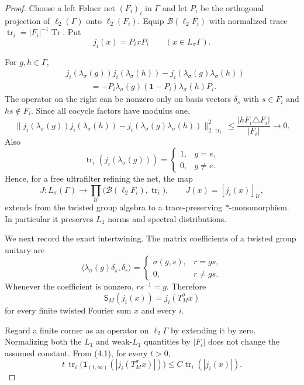 \documentclass[11pt]{article}
\theoremstyle{remark}
\newcommand{\Tr}{\operatorname{Tr}}
\newcommand{\one}{\mathbf 1}
\begin{document}
\begin{proof}
Choose a left F\o lner net $(F_i)_i$ in $\Gamma$ and let $P_i$ be the
orthogonal projection of $\ell_2(\Gamma)$ onto $\ell_2(F_i)$. Equip
$\mathcal B(\ell_2F_i)$ with normalized trace
$\operatorname{tr}_i=|F_i|^{-1}\Tr$. Put
\[
 j_i(x)=P_i xP_i \qquad (x\in L_\sigma\Gamma).
\]

For $g,h\in\Gamma$,
\begin{align*}
 &j_i(\lambda_\sigma(g))j_i(\lambda_\sigma(h))
   -j_i(\lambda_\sigma(g)\lambda_\sigma(h))\\
 &\hspace{3em}
 =-P_i\lambda_\sigma(g)(\one-P_i)\lambda_\sigma(h)P_i.
\end{align*}
The operator on the right can be nonzero only on basis vectors
$\delta_s$ with $s\in F_i$ and $hs\notin F_i$. Since all cocycle factors
have modulus one,
\[
 \big\|j_i(\lambda_\sigma(g))j_i(\lambda_\sigma(h))
 -j_i(\lambda_\sigma(g)\lambda_\sigma(h))\big\|_{2,\operatorname{tr}_i}^2
 \le \frac{|hF_i\triangle F_i|}{|F_i|}\longrightarrow0.
\]
Also
\[
 \operatorname{tr}_i(j_i(\lambda_\sigma(g)))
 =\begin{cases}1,&g=e,\\0,&g\ne e.\end{cases}
\]
Hence, for a free ultrafilter refining the net, the map
\[
 J:L_\sigma(\Gamma)\longrightarrow
 \prod_{\mathcal U}\big(\mathcal B(\ell_2F_i),\operatorname{tr}_i\big),
 \qquad J(x)=[j_i(x)]_{\mathcal U},
\]
extends from the twisted group algebra to a trace-preserving
$*$-monomorphism. In particular it preserves $L_1$ norms and spectral
distributions.

We next record the exact intertwining. The matrix coefficients of a twisted
group unitary are
\[
 \langle\lambda_\sigma(g)\delta_s,\delta_r\rangle
 =\begin{cases}\sigma(g,s),&r=gs,\\0,&r\ne gs.\end{cases}
\]
Whenever the coefficient is nonzero, $rs^{-1}=g$. Therefore
\[
 \mathsf S_M(j_i(x))=j_i(T_M^\sigma x)                 \tag{4.1}
\]
for every finite twisted Fourier sum $x$ and every $i$.

Regard a finite corner as an operator on $\ell_2\Gamma$ by extending it by
zero. Normalizing both the $L_1$ and weak-$L_1$ quantities by $|F_i|$
does not change the assumed constant. From (4.1), for every $t>0$,
\[
 t\,\operatorname{tr}_i
 \big(\one_{(t,\infty)}(|j_i(T_M^\sigma x)|)\big)
 \le C\operatorname{tr}_i(|j_i(x)|).                 \tag{4.2}
\]


\end{proof}
\end{document}
